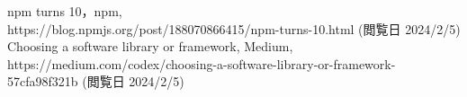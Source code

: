 \documentclass[main]{subfiles}
\begin{document}
\begin{thebibliography}{9}\setlength{\itemsep}{-2pt}

 npm turns 10，npm, \\https://blog.npmjs.org/post/188070866415/npm-turns-10.html (閲覧日 2024/2/5) 
 Choosing a software library or framework, Medium,\\ https://medium.com/codex/choosing-a-software-library-or-framework-57cfa98f321b (閲覧日 2024/2/5) 
\end{thebibliography}
\end{document}
